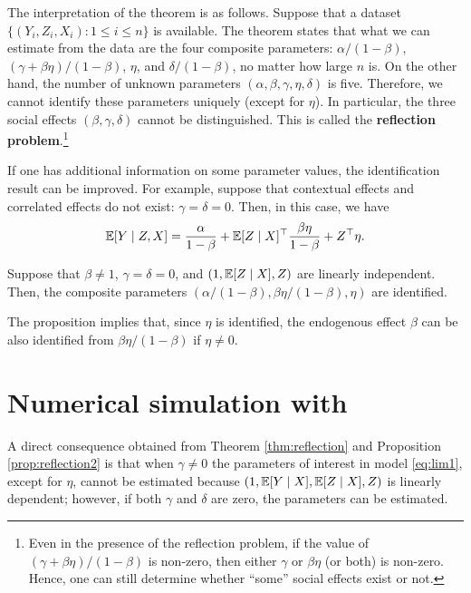 \documentclass[11pt, A4paper, openany, uplatex]{book}
\begin{document}
The interpretation of the theorem is as follows.
Suppose that a dataset $\{(Y_i, Z_i, X_i): 1 \le i \le n\}$ is available.
The theorem states that what we can estimate from the data are the four composite parameters: $\alpha/(1 -\beta)$, $(\gamma + \beta \eta)/(1 - \beta)$, $\eta$, and $\delta/(1 - \beta)$, no matter how large $n$ is.
On the other hand, the number of unknown parameters $(\alpha, \beta, \gamma, \eta, \delta)$ is five.
Therefore, we cannot identify these parameters uniquely (except for $\eta$).
In particular, the three social effects $(\beta, \gamma, \delta)$ cannot be distinguished.
This is called the \textbf{reflection problem}.\footnote{
	Even in the presence of the reflection problem, if the value of $(\gamma + \beta \eta)/(1 - \beta)$ is non-zero, then either $\gamma$ or $\beta\eta$ (or both) is non-zero.
	Hence, one can still determine whether ``some'' social effects exist or not.
	}

If one has additional information on some parameter values, the identification result can be improved.
For example, suppose that contextual effects and correlated effects do not exist: $\gamma = \delta = 0$. Then, in this case, we have
\begin{align*}
	\mathbb{E}[Y \mid Z, X] = \frac{\alpha}{1 -\beta} + \mathbb{E}[Z \mid X]^\top\frac{\beta \eta}{1 - \beta} + Z^\top \eta .
\end{align*}
\begin{proposition}\label{prop:reflection2} 
	Suppose that $\beta \neq 1$, $\gamma = \delta = 0$, and $(1, \mathbb{E}[Z \mid X], Z)$ are linearly independent. 
	Then, the composite parameters $(\alpha/(1 -\beta),  \beta \eta/(1 - \beta), \eta)$ are identified.
\end{proposition}

The proposition implies that, since $\eta$ is identified, the endogenous effect $\beta$ can be also identified from $\beta \eta / (1 - \beta)$ if $\eta \neq 0$.

\section{Numerical simulation with \R}

A direct consequence obtained from Theorem \ref{thm:reflection} and Proposition \ref{prop:reflection2} is that when $\gamma \neq 0$ the parameters of interest in model \eqref{eq:lim1}, except for $\eta$, cannot be estimated because $(1, \mathbb{E}[Y \mid X], \mathbb{E}[Z \mid X], Z)$ is linearly dependent; however, if both $\gamma$ and $\delta$ are zero, the parameters can be estimated.
\end{document}
